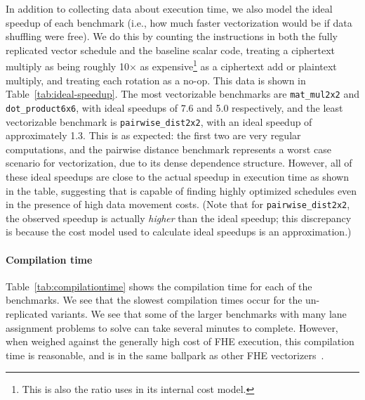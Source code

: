 In addition to collecting data about execution time, we also model the ideal speedup of each benchmark (i.e., how much faster vectorization would be if data shuffling were free).
We do this by counting the instructions in both the fully replicated vector schedule and the baseline scalar code, treating a ciphertext multiply as being roughly 10$\times$ as expensive\footnote{This is also the ratio \system uses in its internal cost model.} as a ciphertext add or plaintext multiply, and treating each rotation as a no-op.
This data is shown in Table~\ref{tab:ideal-speedup}.
The most vectorizable benchmarks are \texttt{mat\_mul2x2} and \texttt{dot\_product6x6}, with ideal speedups of 7.6 and 5.0 respectively, and the least vectorizable benchmark is \texttt{pairwise\_dist2x2}, with an ideal speedup of approximately 1.3.
This is as expected: the first two are very regular computations, and the pairwise distance benchmark represents a worst case scenario for vectorization, due to its dense dependence structure.
However, all of these ideal speedups are close to the actual speedup in execution time as shown in the table, suggesting that \system is capable of finding highly optimized schedules even in the presence of high data movement costs. (Note that for \texttt{pairwise\_dist2x2}, the observed speedup is actually {\em higher} than the ideal speedup; this discrepancy is because the cost model used to calculate ideal speedups is an approximation.)

\paragraph{Compilation time}
Table~\ref{tab:compilationtime} shows the compilation time for each of the benchmarks. We see that the slowest compilation times occur for the un-replicated variants. We see that some of the larger benchmarks with many lane assignment problems to solve can take several minutes to complete. However, when weighed against the generally high cost of FHE execution, this compilation time is reasonable, and is in the same ballpark as other FHE vectorizers~\cite{Porcupine}.

